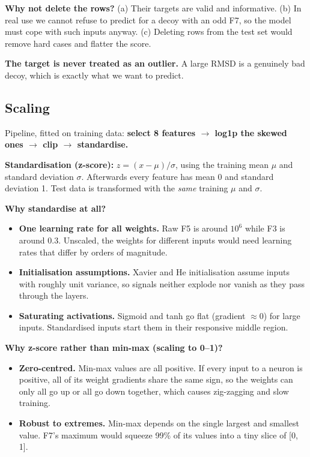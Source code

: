 \documentclass[11pt,a4paper]{article}
\begin{document}
\textbf{Why not delete the rows?} (a) Their targets are valid and informative. (b) In real use we cannot refuse to
predict for a decoy with an odd F7, so the model must cope with such inputs anyway. (c) Deleting rows from the test
set would remove hard cases and flatter the score.

\textbf{The target is never treated as an outlier.} A large RMSD is a genuinely bad decoy, which is exactly what we
want to predict.

\subsection{Scaling}
Pipeline, fitted on training data: \textbf{select 8 features $\to$ log1p the skewed ones $\to$ clip $\to$ standardise.}

\textbf{Standardisation (z-score):} $z = (x - \mu) / \sigma$, using the training mean $\mu$ and standard deviation
$\sigma$. Afterwards every feature has mean 0 and standard deviation 1. Test data is transformed with the
\emph{same} training $\mu$ and $\sigma$.

\textbf{Why standardise at all?}
\begin{itemize}
  \item \textbf{One learning rate for all weights.} Raw F5 is around $10^6$ while F3 is around 0.3. Unscaled, the weights
        for different inputs would need learning rates that differ by orders of magnitude.
  \item \textbf{Initialisation assumptions.} Xavier and He initialisation assume inputs with roughly unit variance, so
        signals neither explode nor vanish as they pass through the layers.
  \item \textbf{Saturating activations.} Sigmoid and tanh go flat (gradient $\approx 0$) for large inputs. Standardised
        inputs start them in their responsive middle region.
\end{itemize}

\textbf{Why z-score rather than min-max (scaling to 0--1)?}
\begin{itemize}
  \item \textbf{Zero-centred.} Min-max values are all positive. If every input to a neuron is positive, all of its weight
        gradients share the same sign, so the weights can only all go up or all go down together, which causes
        zig-zagging and slow training.
  \item \textbf{Robust to extremes.} Min-max depends on the single largest and smallest value. F7's maximum would squeeze
        99\% of its values into a tiny slice of [0, 1].
\end{itemize}
\end{document}

